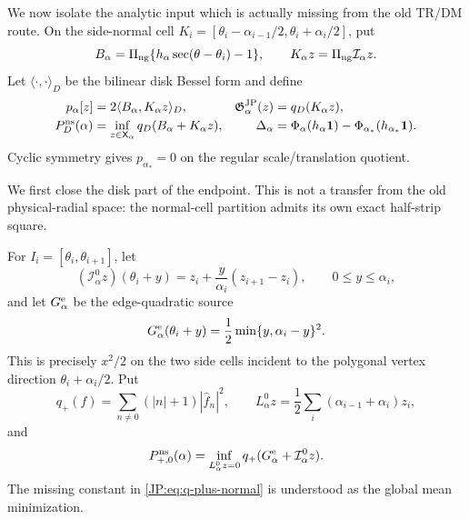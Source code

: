 We now isolate the analytic input which is actually missing from the old
TR/DM route.  On the side-normal cell
$K_i=[\theta_i-\alpha_{i-1}/2,\theta_i+\alpha_i/2]$, put
\begin{equation}\label{JP:eq:disk-source-B}
 B_\alpha=\Pi_{\rm ng}\{h_\alpha\sec(\theta-\theta_i)-1\},
 \qquad K_\alpha z=\Pi_{\rm ng}\mathcal I_\alpha z.
\end{equation}
Let $\langle\cdot,\cdot\rangle_D$ be the bilinear disk Bessel form and
define
\begin{align}
 p_\alpha[z]&=2\langle B_\alpha,K_\alpha z\rangle_D,
 &\mathfrak G^{\rm JP}_\alpha(z)&=q_D(K_\alpha z),\label{JP:eq:JE-forms}\\
 P_D^{\rm ns}(\alpha)&=
 \inf_{z\in\mathsf X_\alpha}q_D(B_\alpha+K_\alpha z),
 &\Delta_\alpha&=
 \Phi_\alpha(h_\alpha\mathbf1)
 -\Phi_{\alpha_*}(h_{\alpha_*}\mathbf1).
 \label{JP:eq:D0ns-definition}
\end{align}
Cyclic symmetry gives $p_{\alpha_*}=0$ on the regular scale/translation
quotient.

We first close the disk part of the endpoint.  This is not a transfer from
the old physical-radial space: the normal-cell partition admits its own
exact half-strip square.

For $I_i=[\theta_i,\theta_{i+1}]$, let
\begin{equation}\label{JP:eq:normal-linear-spline}
 (\mathcal I_\alpha^0z)(\theta_i+y)
 =z_i+\frac{y}{\alpha_i}(z_{i+1}-z_i),
 \qquad 0\le y\le\alpha_i,
\end{equation}
and let $G_\alpha^{\rm e}$ be the edge-quadratic source
\begin{equation}\label{JP:eq:edge-source-on-normal-cell}
 G_\alpha^{\rm e}(\theta_i+y)
 =\frac12\min\{y,\alpha_i-y\}^2.
\end{equation}
This is precisely $x^2/2$ on the two side cells incident to the polygonal
vertex direction $\theta_i+\alpha_i/2$.  Put
\begin{equation}\label{JP:eq:q-plus-normal}
 q_+(f)=\sum_{n\ne0}(|n|+1)|\widehat f_n|^2,
 \qquad
 L_\alpha^0z=\frac12\sum_i(\alpha_{i-1}+\alpha_i)z_i,
\end{equation}
and
\begin{equation}\label{JP:eq:P-plus-normal-linear}
 P_{+,0}^{\rm ns}(\alpha)
 =\inf_{L_\alpha^0z=0}q_+(G_\alpha^{\rm e}+\mathcal I_\alpha^0z).
\end{equation}
The missing constant in \eqref{JP:eq:q-plus-normal} is understood as the
global mean minimization.

